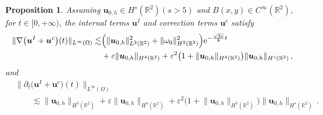 \documentclass[pdflatex,sn-mathphys-num]{sn-jnl}%
\theoremstyle{thmstyleone}%
\newtheorem{proposition}[theorem]{Proposition}%
\theoremstyle{thmstyletwo}%
\theoremstyle{thmstylethree}%
\theoremstyle{thmstyletwo}
\begin{document}
\begin{proposition}\label{propIC}
	Assuming ${\boldsymbol{u}}_{0,h}\in H^s(\mathbb{R}^2)(s>5)$ and $B(x,y)\in C^\infty(\mathbb{R}^2)$, 
	for $t\in [0,+\infty)$,
	the internal terms $\boldsymbol{u}^I$ and correction terms $\boldsymbol{u}^c$ satisfy 
	\begin{align*} 
		\lVert \nabla\big(
		\boldsymbol{u}^{I} 
		+\boldsymbol{u}^{c}
		\big)(t)
		\rVert_{L^{\infty}(\Omega)}
		\lesssim
		&\Big(\lVert{\boldsymbol{u}}_{0,h}\rVert_{L^2(\mathbb{R}^2)}^2+\lVert{\omega}_0\rVert_{H^2(\mathbb{R}^2)}^2\Big) \mathrm{e}^{-\frac{\sqrt{2\nu}}{8}  t}
		\notag\\
		&+\varepsilon
		\lVert {\boldsymbol{u}}_{0,h} \rVert_{H^{4}(\mathbb{R}^2)}
		+\varepsilon^2
		\big(
		1+
		\lVert {\boldsymbol{u}}_{0,h} \rVert_{H^{4}(\mathbb{R}^2)}
		\big)
		\lVert {\boldsymbol{u}}_{0,h} \rVert_{H^{s}(\mathbb{R}^2)}\,,
	\end{align*}
	and
	\begin{align*} 
		&\lVert \partial_t
		\big(
		\boldsymbol{u}^{I} 
		+\boldsymbol{u}^{c}\big)(t) \rVert_{L^{\infty}(\Omega)}\\
		&\qquad\lesssim
		\lVert{\boldsymbol{u}}_{0,h}\rVert_{H^{3}(\mathbb{R}^2)}
		+\varepsilon
		\lVert{\boldsymbol{u}}_{0,h}\rVert_{H^{4}(\mathbb{R}^2)}
		+\varepsilon^2
		\big(
		1+
		\lVert {\boldsymbol{u}}_{0,h} \rVert_{H^{5}(\mathbb{R}^2)}
		\big)
		\lVert {\boldsymbol{u}}_{0,h} \rVert_{H^{s}(\mathbb{R}^2)}\,.
	\end{align*}
\end{proposition}
\end{document}
